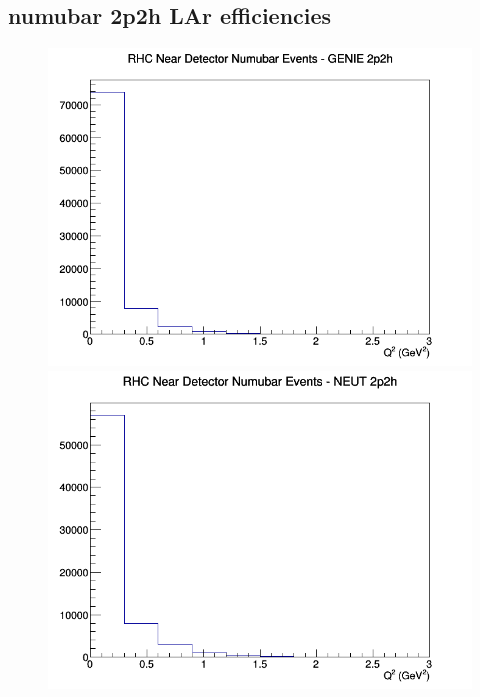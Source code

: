 \documentclass[12pt]{article}
\begin{document}
\subsection{numubar 2p2h LAr efficiencies}
\begin{figure}[h]
\includegraphics[width=\linewidth]{eff_Q2/LAr/2p2h_RHC_ND_numubar_Q2_GENIE.png}
\endminipage
{}
\includegraphics[width=\linewidth]{eff_Q2/LAr/2p2h_RHC_ND_numubar_Q2_NEUT.png}
\endminipage
{}

\end{figure}
\end{document}
